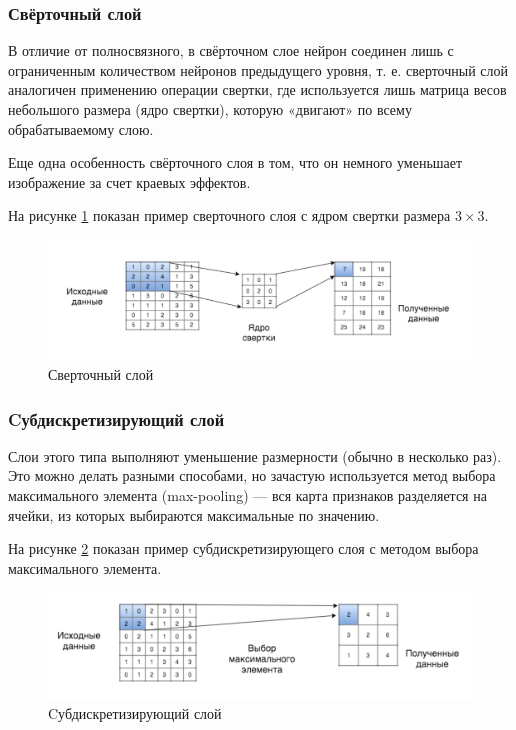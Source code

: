 \subsubsection{Свёрточный слой} \label{conv_layers}
В отличие от полносвязного, в свёрточном слое нейрон соединен лишь с ограниченным количеством нейронов предыдущего уровня, т. е. сверточный слой аналогичен применению операции свертки, где используется лишь матрица весов небольшого размера (ядро свертки), которую «двигают» по всему обрабатываемому слою.

Еще одна особенность свёрточного слоя в том, что он немного уменьшает изображение за счет краевых эффектов.

На рисунке \ref{fig:conv_layer} показан пример сверточного слоя с ядром свертки размера $3 \times 3$.
\begin{figure}[ht]
    \centering
    \includegraphics [width=\textwidth*2/3] {images/conv_layer.png}
    \caption{Сверточный слой}
    \label{fig:conv_layer}
\end{figure}

\subsubsection{Cубдискретизирующий слой} \label{pooling_rev}
Слои этого типа выполняют уменьшение размерности (обычно в несколько раз). Это можно делать разными способами, но зачастую используется метод выбора максимального элемента (max-pooling) — вся карта признаков разделяется на ячейки, из которых выбираются максимальные по значению.

На рисунке \ref{fig:pooling_layer} показан пример субдискретизирующего слоя с методом выбора максимального элемента.
\begin{figure}[ht]
    \centering
    \includegraphics [width=\textwidth*2/3] {images/pooling_layer.png}
    \caption{Cубдискретизирующий слой}
    \label{fig:pooling_layer}
\end{figure}

